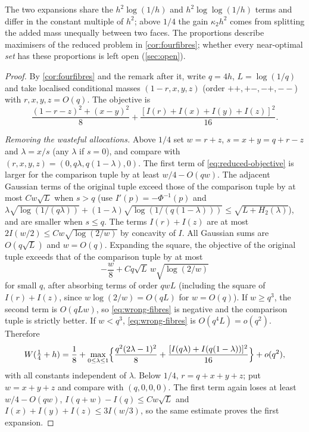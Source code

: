\documentclass[11pt,a4paper]{article}
\numberwithin{equation}{section}
\theoremstyle{remark}
\begin{document}
The two expansions share the $h^2\log(1/h)$ and $h^2\log\log(1/h)$ terms
and differ in the constant multiple of $h^2$; above $1/4$ the gain
$\kappa_2h^2$ comes from splitting the added mass unequally between two
faces. The proportions describe maximisers of the reduced problem in
\cref{cor:fourfibres}; whether every near-optimal \emph{set} has these
proportions is left open (\cref{sec:open}).

\begin{proof}
By \cref{cor:fourfibres} and the remark after it, write $q=4h$,
$L=\log(1/q)$ and take localised conditional masses
$(1-r,x,y,z)$ (order $++,+-,-+,--$) with $r,x,y,z=O(q)$. The objective is
\begin{equation}\label{eq:reduced-objective}
 \frac{(1-r-z)^2+(x-y)^2}{8}+\frac{[I(r)+I(x)+I(y)+I(z)]^2}{16}.
\end{equation}

\emph{Removing the wasteful allocations.} Above $1/4$ set $w=r+z$,
$s=x+y=q+r-z$ and $\lambda=x/s$ (any $\lambda$ if $s=0$), and compare with
$(r,x,y,z)=(0,q\lambda,q(1-\lambda),0)$. The first term of
\eqref{eq:reduced-objective} is larger for the comparison tuple by at least
$w/4-O(qw)$. The adjacent Gaussian terms of the original tuple exceed those
of the comparison tuple by at most $Cw\sqrt L$ when $s>q$ (use
$I'(p)=-\Phi^{-1}(p)$ and
$\lambda\sqrt{\log(1/(q\lambda))}+(1-\lambda)\sqrt{\log(1/(q(1-\lambda)))}\le\sqrt{L+H_2(\lambda)}$),
and are smaller when $s\le q$. The terms $I(r)+I(z)$ are at most
$2I(w/2)\le Cw\sqrt{\log(2/w)}$ by concavity of $I$. All Gaussian sums are
$O(q\sqrt L)$ and $w=O(q)$. Expanding the square, the objective of the
original tuple exceeds that of the comparison tuple by at most
\begin{equation}\label{eq:wrong-fibres}
 -\frac w8+Cq\sqrt L\,w\sqrt{\log(2/w)}
\end{equation}
for small $q$, after absorbing terms of order $qwL$ (including the square
of $I(r)+I(z)$, since $w\log(2/w)=O(qL)$ for $w=O(q)$). If $w\ge q^3$, the
second term is $O(qLw)$, so \eqref{eq:wrong-fibres} is negative and the
comparison tuple is strictly better. If $w<q^3$, \eqref{eq:wrong-fibres}
is $O(q^4L)=o(q^2)$. Therefore
\begin{equation}\label{eq:adjacent-reduction}
 W(\tfrac14+h)=\frac18+\max_{0\le\lambda\le1}\Bigl\{\frac{q^2(2\lambda-1)^2}{8}
 +\frac{[I(q\lambda)+I(q(1-\lambda))]^2}{16}\Bigr\}+o(q^2),
\end{equation}
with all constants independent of $\lambda$. Below $1/4$, $r=q+x+y+z$;
put $w=x+y+z$ and compare with $(q,0,0,0)$. The first term again loses at
least $w/4-O(qw)$, $I(q+w)-I(q)\le Cw\sqrt L$ and
$I(x)+I(y)+I(z)\le3I(w/3)$, so the same estimate proves the first
expansion.


\end{proof}
\end{document}
